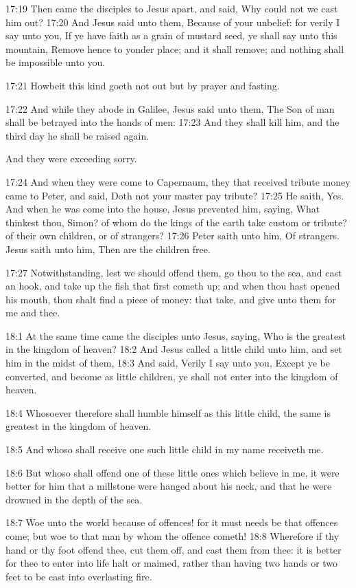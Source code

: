 17:19 Then came the disciples to Jesus apart, and said, Why could not we cast him out?  17:20 And Jesus said unto them, Because of your unbelief: for verily I say unto you, If ye have faith as a grain of mustard seed, ye shall say unto this mountain, Remove hence to yonder place; and it shall remove; and nothing shall be impossible unto you.

17:21 Howbeit this kind goeth not out but by prayer and fasting.

17:22 And while they abode in Galilee, Jesus said unto them, The Son of man shall be betrayed into the hands of men: 17:23 And they shall kill him, and the third day he shall be raised again.

And they were exceeding sorry.

17:24 And when they were come to Capernaum, they that received tribute money came to Peter, and said, Doth not your master pay tribute?  17:25 He saith, Yes. And when he was come into the house, Jesus prevented him, saying, What thinkest thou, Simon? of whom do the kings of the earth take custom or tribute? of their own children, or of strangers?  17:26 Peter saith unto him, Of strangers. Jesus saith unto him, Then are the children free.

17:27 Notwithstanding, lest we should offend them, go thou to the sea, and cast an hook, and take up the fish that first cometh up; and when thou hast opened his mouth, thou shalt find a piece of money: that take, and give unto them for me and thee.

18:1 At the same time came the disciples unto Jesus, saying, Who is the greatest in the kingdom of heaven?  18:2 And Jesus called a little child unto him, and set him in the midst of them, 18:3 And said, Verily I say unto you, Except ye be converted, and become as little children, ye shall not enter into the kingdom of heaven.

18:4 Whosoever therefore shall humble himself as this little child, the same is greatest in the kingdom of heaven.

18:5 And whoso shall receive one such little child in my name receiveth me.

18:6 But whoso shall offend one of these little ones which believe in me, it were better for him that a millstone were hanged about his neck, and that he were drowned in the depth of the sea.

18:7 Woe unto the world because of offences! for it must needs be that offences come; but woe to that man by whom the offence cometh!  18:8 Wherefore if thy hand or thy foot offend thee, cut them off, and cast them from thee: it is better for thee to enter into life halt or maimed, rather than having two hands or two feet to be cast into everlasting fire.

